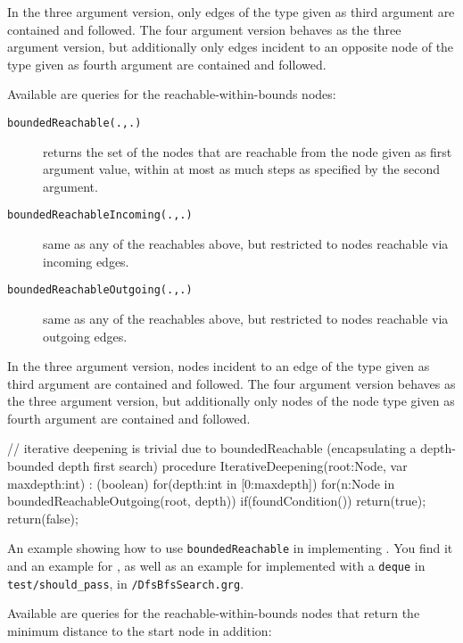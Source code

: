 In the three argument version, only edges of the type given as third argument are contained and followed.
The four argument version behaves as the three argument version, but additionally only edges incident to an opposite node of the type given as fourth argument are contained and followed.

Available are queries for the reachable-within-bounds nodes:

\begin{description}
\item[\texttt{boundedReachable(.,.)}] returns the set of the nodes that are reachable from the node given as first argument value, within at most as much steps as specified by the second argument.
\item[\texttt{boundedReachableIncoming(.,.)}] same as any of the reachables above, but restricted to nodes reachable via incoming edges.
\item[\texttt{boundedReachableOutgoing(.,.)}] same as any of the reachables above, but restricted to nodes reachable via outgoing edges.
\end{description}

In the three argument version, nodes incident to an edge of the type given as third argument are contained and followed.
The four argument version behaves as the three argument version, but additionally only nodes of the node type given as fourth argument are contained and followed.

\begin{example}
\begin{grgen}
// iterative deepening is trivial due to boundedReachable (encapsulating a depth-bounded depth first search)
procedure IterativeDeepening(root:Node, var maxdepth:int) : (boolean)
{
    for(depth:int in [0:maxdepth])
    {
        for(n:Node in boundedReachableOutgoing(root, depth))
        { 
            if(foundCondition()) {
                return(true);
            }
        }		
    }
    return(false);
}
\end{grgen}
An example showing how to use \texttt{boundedReachable} in implementing .
You find it and an example for , as well as an example for  implemented with a \texttt{deque} in \texttt{test/should\_pass}, in \texttt{/DfsBfsSearch.grg}.
\end{example}

Available are queries for the reachable-within-bounds nodes that return the minimum distance to the start node in addition:


